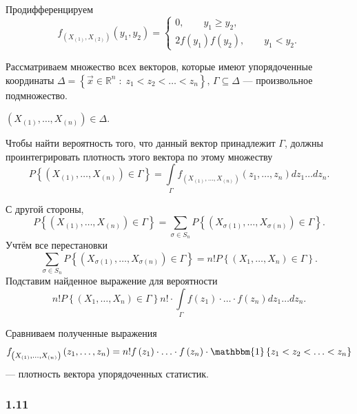 Продифференцируем
\begin{equation*}
    f_{ \left( X_{ \left( 1 \right) }, X_{ \left( 2 \right) } \right) } \left( y_1, y_2 \right) =
    \begin{cases}
      0, \qquad y_1 \geq y_2, \\
      2f \left( y_1 \right) f \left( y_2 \right), \qquad y_1 < y_2.
    \end{cases}
\end{equation*}

Рассматриваем множество всех векторов,
которые имеют упорядоченные координаты
$ \Delta = \left\{ \vec{x} \in \mathbb{R}^n \; : \; z_1 < z_2 < \dotsc < z_n \right\}, \,
  \Gamma \subseteq \Delta $
--- произвольное подмножество.

$ \left( X_{ \left( 1 \right) }, \dotsc, X_{ \left( n \right) } \right) \in
  \Delta$.

Чтобы найти вероятность того, что данный вектор принадлежит $ \Gamma $,
должны проинтегрировать плотность этого вектора по этому множеству
$$P \left\{
    \left( X_{ \left( 1 \right) }, \dotsc, X_{ \left( n \right) } \right) \in \Gamma
  \right\} =
  \int \limits_{ \Gamma }
    f_{ \left( X_{ \left( 1 \right) }, \dotsc, X_{ \left( n \right) } \right) }
    \left( z_1, \dotsc, z_n \right)
  dz_1 \dotsc dz_n.$$

С другой стороны,
$$P \left\{
    \left( X_{ \left( 1 \right) }, \dotsc, X_{ \left( n \right) } \right) \in \Gamma
  \right\} =
  \sum \limits_{ \sigma \in S_n}
    P \left\{
      \left( X_{ \sigma \left( 1 \right) }, \dotsc, X_{ \sigma \left( n \right) } \right) \in \Gamma
    \right\}.$$
Учтём все перестановки
$$ \sum \limits_{ \sigma \in S_n}
  P \left\{
    \left( X_{ \sigma \left( 1 \right)}, \dotsc, X_{ \sigma \left( n \right) } \right) \in \Gamma
  \right\} =
  n! P \left\{ \left( X_1, \dotsc, X_n \right) \in \Gamma \right\}.$$
Подставим найденное выражение для вероятности
$$n! P \left\{ \left( X_1, \dotsc, X_n \right) \in \Gamma \right\}
  n! \cdot
  \int \limits_{ \Gamma }
    f \left( z_1 \right) \cdot \dotsc \cdot f \left( z_n \right)
  dz_1 \dotsc dz_n.$$

Сравниваем полученные выражения
$$f_{ \left( X_{ \left( 1 \right) }, \dotsc, X_{ \left( n \right) } \right) }
  \left( z_1, \dotsc, z_n \right) =
  n! f \left( z_1 \right) \cdot \dotsc \cdot f \left( z_n \right) \cdot
  \mathbbm{1} \left\{ z_1 < z_2 < \dotsc < z_n \right\}$$
--- плотность вектора упорядоченных статистик.

\subsubsection*{1.11}

